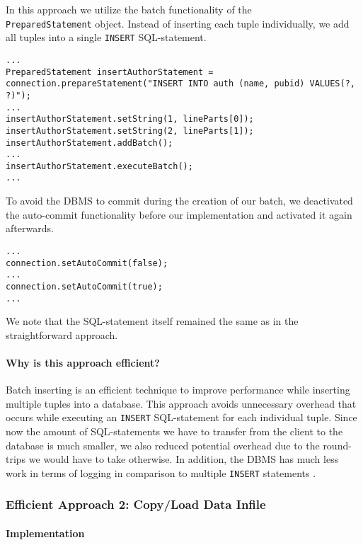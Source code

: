 \documentclass[11pt]{scrartcl}
\begin{document}
In this approach we utilize the batch functionality of the \\
\texttt{PreparedStatement} object.
Instead of inserting each tuple individually, we add all tuples into a single \texttt{INSERT} SQL-statement.

\begin{lstlisting}[style=mystyle-java, caption={Implementation: Batch approach}]
...
PreparedStatement insertAuthorStatement = connection.prepareStatement("INSERT INTO auth (name, pubid) VALUES(?, ?)");
...
insertAuthorStatement.setString(1, lineParts[0]);
insertAuthorStatement.setString(2, lineParts[1]);
insertAuthorStatement.addBatch();
...
insertAuthorStatement.executeBatch();
...
\end{lstlisting}

To avoid the DBMS to commit during the creation of our batch, we deactivated the auto-commit functionality before our
implementation and activated it again afterwards.

\begin{lstlisting}[style=mystyle-java, caption={Implementation: Auto-commit in batch approach}]
...
connection.setAutoCommit(false);
...
connection.setAutoCommit(true);
...
\end{lstlisting}

We note that the SQL-statement itself remained the same as in the straightforward approach.

\paragraph{Why is this approach efficient?}

Batch inserting is an efficient technique to improve performance while inserting multiple tuples into a database.
This approach avoids unnecessary overhead that occurs while executing an \texttt{INSERT} SQL-statement for each
individual tuple.
Since now the amount of SQL-statements we have to transfer from the client to the database is much smaller, we also
reduced potential overhead due to the round-trips we would have to take otherwise.
In addition, the DBMS has much less work in terms of logging in comparison to multiple \texttt{INSERT} statements
\cite{Cencio2020}.

\subsubsection*{Efficient Approach 2: Copy/Load Data Infile}

\paragraph{Implementation}
\end{document}
